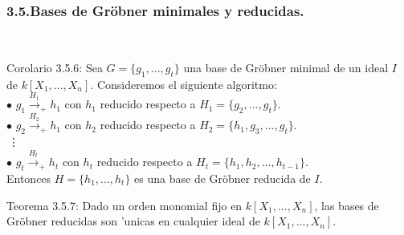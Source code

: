 \documentclass[10pt]{beamer}
\begin{document}
\begin{frame}
\frametitle{3.5.Bases de Gr\"obner minimales y reducidas.}\\
\begin{block}{Corolario 3.5.6:}
Sea $G=\{g_1,...,g_t\}$ una base de Gr\"obner minimal de un ideal $I$ de $k[X_1,...,X_n]$. Consideremos el siguiente algoritmo:\\
$\bullet$ $g_1 \overset{H_1}{\longrightarrow}_{+}h_1$ con $h_1$ reducido respecto a $H_1=\{g_2,...,g_t\}$.\\
$\bullet$ $g_2 \overset{H_2}{\longrightarrow}_{+}h_1$ con $h_2$ reducido respecto a $H_2=\{h_1,g_3,...,g_t\}$.\\
$\,$\vdots\\
$\bullet$ $g_t \overset{H_t}{\longrightarrow}_{+}h_t$ con $h_t$ reducido respecto a $H_t=\{h_1,h_2,...,h_{t-1}\}$.\\
Entonces $H=\{h_1,...,h_t\}$ es una base de Gr\"obner reducida de $I$.\\
\end{block}
\begin{block}{Teorema 3.5.7:}
Dado un orden monomial fijo en $k[X_1,...,X_n]$, las bases de Gr\"obner reducidas son 'unicas en cualquier ideal de $k[X_1,...,X_n]$.\\
\end{block}
\vspace{5cm}
\end{frame}
\end{document}
